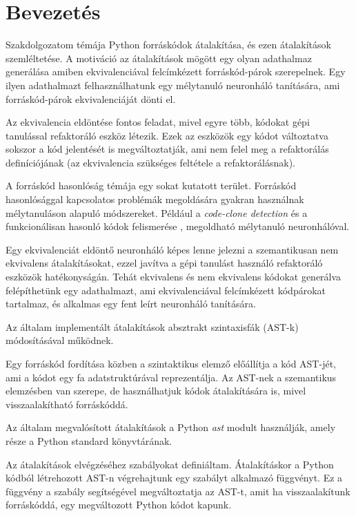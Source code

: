 \chapter{Bevezetés}
\label{ch:intro}

Szakdolgozatom témája Python forráskódok átalakítása, és ezen átalakítások szemléltetése.
A motiváció az átalakítások mögött egy olyan adathalmaz generálása amiben
ekvivalenciával felcímkézett forráskód-párok szerepelnek.
Egy ilyen adathalmazt felhasználhatunk egy mélytanuló
neuronháló tanítására, ami forráskód-párok ekvivalenciáját dönti el.

Az ekvivalencia eldöntése fontos feladat, mivel egyre több, kódokat gépi tanulással refaktoráló eszköz létezik.
Ezek az eszközök egy kódot változtatva sokszor a kód jelentését is megváltoztatják, ami nem felel meg
a refaktorálás definíciójának (az ekvivalencia szükséges feltétele a refaktorálásnak).

A forráskód hasonlóság témája egy sokat kutatott terület.
Forráskód hasonlósággal kapcsolatos problémák megoldására gyakran használnak mélytanuláson alapuló módszereket.
Például a \emph{code-clone detection} \cite{CCLearner} és a funkcionálisan hasonló kódok felismerése \cite{DeepSim}, \cite{ContrastiveCodeRepr}
megoldható mélytanuló neuronhálóval.

Egy ekvivalenciát eldöntő neuronháló képes lenne jelezni a szemantikusan nem ekvivalens átalakításokat,
ezzel javítva a gépi tanulást használó refaktoráló eszközök hatékonyságán.
Tehát ekvivalens és nem ekvivalens kódokat generálva felépíthetünk egy adathalmazt, ami
ekvivalenciával felcímkézett kódpárokat tartalmaz, és alkalmas egy fent leírt neuronháló
tanítására.

Az általam implementált átalakítások absztrakt szintaxisfák (AST-k) módosításával működnek.

Egy forráskód fordítása közben a szintaktikus elemző előállítja a kód AST-jét,
ami a kódot egy fa adatstruktúrával reprezentálja.
Az AST-nek a szemantikus elemzésben van szerepe,
de használhatjuk kódok átalakítására is, mivel visszaalakítható forráskóddá.

Az általam megvalósított átalakítások a Python \emph{ast} modult \cite{pythonAST} használják,
amely része a Python standard könyvtárának.

Az átalakítások elvégzéséhez szabályokat definiáltam.
Átalakításkor a Python kódból létrehozott AST-n végrehajtunk egy szabályt alkalmazó függvényt.
Ez a függvény a szabály segítségével megváltoztatja az AST-t, amit ha visszaalakítunk forráskóddá,
egy megváltozott Python kódot kapunk.

